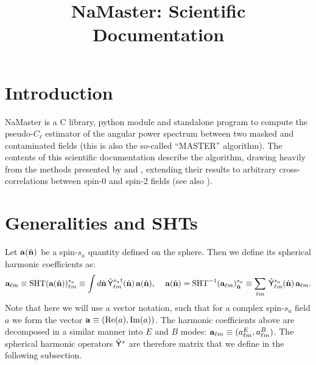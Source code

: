 \documentclass[a4paper,10pt]{article}
\title{NaMaster: Scientific Documentation}
\newcommand{\nv}{\hat{\bf n}}
\begin{document}
\maketitle
\noindent\makebox[\linewidth]{\rule{\textwidth}{1pt}}
\tableofcontents
\noindent\makebox[\linewidth]{\rule{\textwidth}{1pt}}

\section{Introduction}
NaMaster is a C library, python module and standalone program to compute the pseudo-$C_\ell$ estimator of the angular power spectrum between two masked and contaminated fields (this is also the so-called ``MASTER'' algorithm). The contents of this scientific documentation describe the algorithm, drawing heavily from the methods presented by \cite{2002ApJ...567....2H} and \cite{2017MNRAS.465.1847E}, extending their results to arbitrary cross-correlations between spin-0 and spin-2 fields (see also \cite{2003ApJS..148..161K}).

\section{Generalities and SHTs}
Let ${\bf a}(\nv)$ be a spin-$s_a$ quantity defined on the sphere. Then we define its spherical harmonic coefficients as:
\begin{equation}
 {\bf a}_{\ell m}\equiv{\rm SHT}({\bf a}(\nv))^{s_a}_{\ell m}\equiv\int d\nv\,\hat{\sf Y}^{s_a\dag}_{\ell m}(\nv)\,{\bf a}(\nv),\hspace{12pt}
 {\bf a}(\nv)={\rm SHT}^{-1}({\bf a}_{\ell m})^{s_a}_{\nv}\equiv\sum_{\ell m}\,\hat{\sf Y}^{s_a}_{\ell m}(\nv)\,{\bf a}_{\ell m}.
\end{equation}
Note that here we will use a vector notation, such that for a complex spin-$s_a$ field $a$ we form the vector ${\bf a}\equiv({\rm Re}(a),{\rm Im}(a))$. The harmonic coefficients above are decomposed in a similar manner into $E$ and $B$ modes: ${\bf a}_{\ell m}\equiv(a^E_{\ell m},a^B_{\ell m})$. The spherical harmonic operators $\hat{\sf Y}^s$ are therefore matrix that we define in the following subsection.
\end{document}
